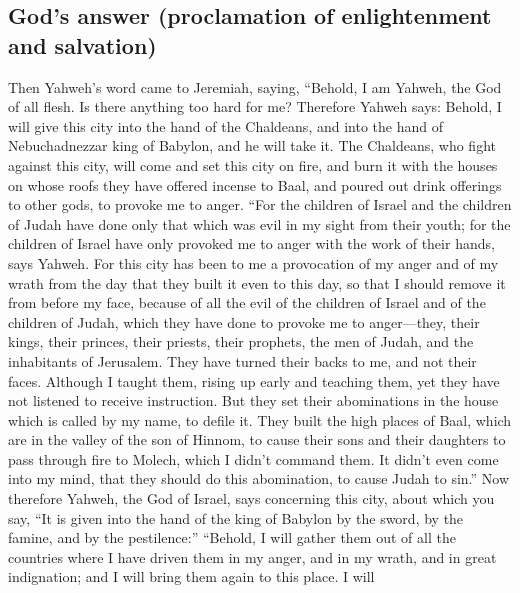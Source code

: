 \hypertarget{gods-answer-proclamation-of-enlightenment-and-salvation}{%
\subsection{God's answer (proclamation of enlightenment and
salvation)}\label{gods-answer-proclamation-of-enlightenment-and-salvation}}

 Then Yahweh's word came to Jeremiah, saying,
 ``Behold, I am Yahweh, the God of all flesh. Is there
anything too hard for me?  Therefore Yahweh says: Behold,
I will give this city into the hand of the Chaldeans, and into the hand
of Nebuchadnezzar king of Babylon, and he will take it. 
The Chaldeans, who fight against this city, will come and set this city
on fire, and burn it with the houses on whose roofs they have offered
incense to Baal, and poured out drink offerings to other gods, to
provoke me to anger.  ``For the children of Israel and
the children of Judah have done only that which was evil in my sight
from their youth; for the children of Israel have only provoked me to
anger with the work of their hands, says Yahweh.  For
this city has been to me a provocation of my anger and of my wrath from
the day that they built it even to this day, so that I should remove it
from before my face,  because of all the evil of the
children of Israel and of the children of Judah, which they have done to
provoke me to anger---they, their kings, their princes, their priests,
their prophets, the men of Judah, and the inhabitants of Jerusalem.
 They have turned their backs to me, and not their faces.
Although I taught them, rising up early and teaching them, yet they have
not listened to receive instruction.  But they set their
abominations in the house which is called by my name, to defile it.
 They built the high places of Baal, which are in the
valley of the son of Hinnom, to cause their sons and their daughters to
pass through fire to Molech, which I didn't command them. It didn't even
come into my mind, that they should do this abomination, to cause Judah
to sin.''  Now therefore Yahweh, the God of Israel, says
concerning this city, about which you say, ``It is given into the hand
of the king of Babylon by the sword, by the famine, and by the
pestilence:''  ``Behold, I will gather them out of all
the countries where I have driven them in my anger, and in my wrath, and
in great indignation; and I will bring them again to this place. I will
